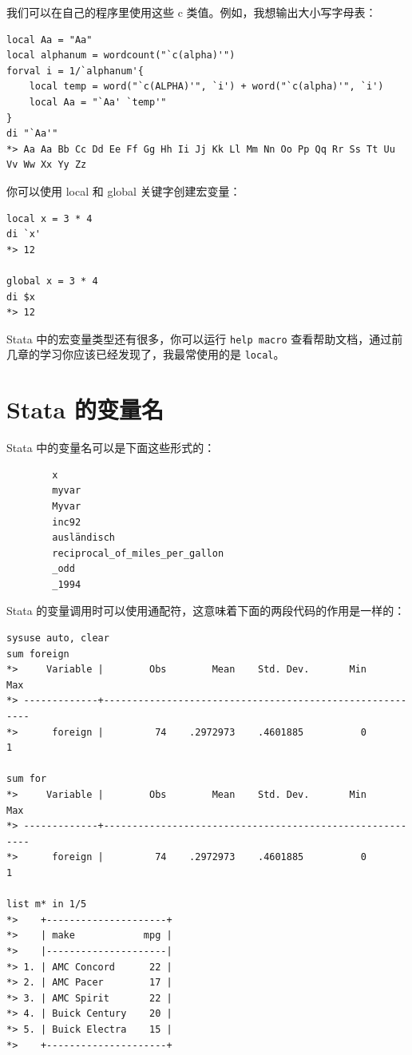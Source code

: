 \documentclass[]{ctexbook}
\begin{document}
我们可以在自己的程序里使用这些 c 类值。例如，我想输出大小写字母表：

\begin{lstlisting}
local Aa = "Aa"
local alphanum = wordcount("`c(alpha)'")
forval i = 1/`alphanum'{
    local temp = word("`c(ALPHA)'", `i') + word("`c(alpha)'", `i')
    local Aa = "`Aa' `temp'"
}
di "`Aa'"
*> Aa Aa Bb Cc Dd Ee Ff Gg Hh Ii Jj Kk Ll Mm Nn Oo Pp Qq Rr Ss Tt Uu Vv Ww Xx Yy Zz
\end{lstlisting}

你可以使用 local 和 global 关键字创建宏变量：

\begin{lstlisting}
local x = 3 * 4
di `x'
*> 12

global x = 3 * 4
di $x
*> 12
\end{lstlisting}

Stata 中的宏变量类型还有很多，你可以运行 \texttt{help\ macro} 查看帮助文档，通过前几章的学习你应该已经发现了，我最常使用的是 \texttt{local}。

\hypertarget{stata--6}{%
\section{Stata 的变量名}\label{stata--6}}

Stata 中的变量名可以是下面这些形式的：

\begin{lstlisting}
        x
        myvar
        Myvar
        inc92
        ausländisch
        reciprocal_of_miles_per_gallon
        _odd
        _1994
\end{lstlisting}

Stata 的变量调用时可以使用通配符，这意味着下面的两段代码的作用是一样的：

\begin{lstlisting}
sysuse auto, clear
sum foreign
*>     Variable |        Obs        Mean    Std. Dev.       Min        Max
*> -------------+---------------------------------------------------------
*>      foreign |         74    .2972973    .4601885          0          1

sum for
*>     Variable |        Obs        Mean    Std. Dev.       Min        Max
*> -------------+---------------------------------------------------------
*>      foreign |         74    .2972973    .4601885          0          1

list m* in 1/5
*>    +---------------------+
*>    | make            mpg |
*>    |---------------------|
*> 1. | AMC Concord      22 |
*> 2. | AMC Pacer        17 |
*> 3. | AMC Spirit       22 |
*> 4. | Buick Century    20 |
*> 5. | Buick Electra    15 |
*>    +---------------------+
\end{lstlisting}
\end{document}
